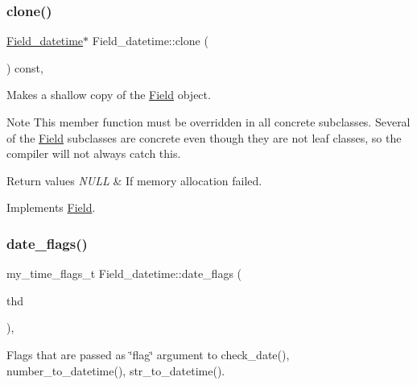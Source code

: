 \subsubsection{\texorpdfstring{clone()}{clone()}\hspace{0.1cm}{\footnotesize\ttfamily [2/2]}}
{\footnotesize\ttfamily \mbox{\hyperlink{classField__datetime}{Field\+\_\+datetime}}$\ast$ Field\+\_\+datetime\+::clone (\begin{DoxyParamCaption}{ }\end{DoxyParamCaption}) const\hspace{0.3cm}{\ttfamily [inline]}, {\ttfamily [virtual]}}

Makes a shallow copy of the \mbox{\hyperlink{classField}{Field}} object.

\begin{DoxyNote}{Note}
This member function must be overridden in all concrete subclasses. Several of the \mbox{\hyperlink{classField}{Field}} subclasses are concrete even though they are not leaf classes, so the compiler will not always catch this.
\end{DoxyNote}

\begin{DoxyRetVals}{Return values}
{\em N\+U\+LL} & If memory allocation failed. \\
\hline
\end{DoxyRetVals}


Implements \mbox{\hyperlink{classField_a01a9a9aa3a618941e839b1b8793c969d}{Field}}.

\mbox{\label{classField__datetime_a893d695981012777af8df5c7fe16769d}} 
\subsubsection{\texorpdfstring{date\+\_\+flags()}{date\_flags()}}
{\footnotesize\ttfamily my\+\_\+time\+\_\+flags\+\_\+t Field\+\_\+datetime\+::date\+\_\+flags (\begin{DoxyParamCaption}\item[{const T\+HD $\ast$}]{thd }\end{DoxyParamCaption})\hspace{0.3cm}{\ttfamily [protected]}, {\ttfamily [virtual]}}

Flags that are passed as \char`\"{}flag\char`\"{} argument to check\+\_\+date(), number\+\_\+to\+\_\+datetime(), str\+\_\+to\+\_\+datetime().


